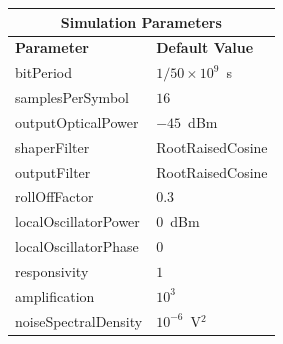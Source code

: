 \begin{table}[H]
	\centering
	\footnotesize
	\begin{tabular}{|l|l|}
		\hline
		\multicolumn{2}{|c|}{ \textbf{Simulation Parameters} } \\
		\hline
		\textbf{Parameter}     & \textbf{Default Value}                                     \\\hline
		bitPeriod              & $1/50\times10^9$~s														\\\hline
		samplesPerSymbol       & $16$                                                       \\\hline
		outputOpticalPower     & $-45$~dBm 													\\ \hline
		shaperFilter	       & RootRaisedCosine												\\ \hline
		outputFilter		   & RootRaisedCosine												\\ \hline
		rollOffFactor		   & 0.3														\\ \hline
		localOscillatorPower   & $0$~dBm                                                    \\ \hline
		localOscillatorPhase   & $0$                                                        \\ \hline
		responsivity           & $1$                                                        \\ \hline
		amplification          & $10^3$                                                     \\ \hline
		noiseSpectralDensity   & $10^{-6}$~V$^2$                             					\\ \hline
	\end{tabular}
\end{table}
